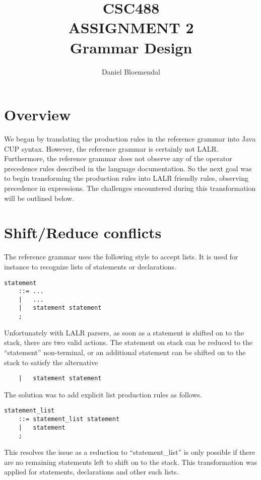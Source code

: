 \documentclass[oneside]{amsart}
\theoremstyle{definition}
\theoremstyle{remark}
\numberwithin{equation}{section}
\begin{document}
\title[CSC488 A2]{CSC488\\ASSIGNMENT 2\\Grammar Design}
\author{Daniel Bloemendal}

\begin{titlepage}
\maketitle
\thispagestyle{empty}
\tableofcontents
\end{titlepage}

\section{Overview}
We began by translating the production rules in the reference grammar into Java CUP syntax. However,
the reference grammar is certainly not LALR. Furthermore, the reference grammar does not observe any
of the operator precedence rules described in the language documentation. So the next goal was to
begin transforming the production rules into LALR friendly rules, observing precedence in
expressions. The challenges encountered during this transformation will be outlined below.

\section{Shift/Reduce conflicts}
The reference grammar uses the following style to accept lists. It is used for instance to recognize
lists of statements or declarations.
\begin{lstlisting}
statement
    ::= ...
    |   ...
    |   statement statement
    ;
\end{lstlisting}
Unfortunately with LALR parsers, as soon as a statement is shifted on to the stack, there are two
valid actions. The statement on stack can be reduced to the ``statement'' non-terminal, or an
additional statement can be shifted on to the stack to satisfy the alternative
\begin{lstlisting}
    |   statement statement
\end{lstlisting}
The solution was to add explicit list production rules as follows.
\begin{lstlisting}
statement_list
    ::= statement_list statement
    |   statement
    ;
\end{lstlisting}
This resolves the issue as a reduction to ``statement\_list'' is only possible if there are no
remaining statements left to shift on to the stack. This transformation was applied for statements,
declarations and other such lists.
\end{document}
